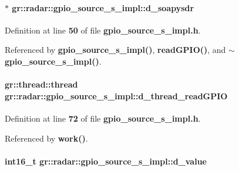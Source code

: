 \paragraph[{d\+\_\+soapysdr}]{$\ast$ gr\+::radar\+::gpio\+\_\+source\+\_\+s\+\_\+impl\+::d\+\_\+soapysdr\hspace{0.3cm}{\ttfamily [private]}}\label{classgr_1_1radar_1_1gpio__source__s__impl_a4428c8a14f93a91cb5294c10dfd43f9f}


Definition at line {\bf 50} of file {\bf gpio\+\_\+source\+\_\+s\+\_\+impl.\+h}.



Referenced by {\bf gpio\+\_\+source\+\_\+s\+\_\+impl()}, {\bf read\+G\+P\+I\+O()}, and {\bf $\sim$gpio\+\_\+source\+\_\+s\+\_\+impl()}.

\paragraph[{d\+\_\+thread\+\_\+read\+G\+P\+IO}]{\setlength{\rightskip}{0pt plus 5cm}gr\+::thread\+::thread gr\+::radar\+::gpio\+\_\+source\+\_\+s\+\_\+impl\+::d\+\_\+thread\+\_\+read\+G\+P\+IO\hspace{0.3cm}{\ttfamily [private]}}\label{classgr_1_1radar_1_1gpio__source__s__impl_aa185f8bf6a4d3d2d21021814976ba308}


Definition at line {\bf 72} of file {\bf gpio\+\_\+source\+\_\+s\+\_\+impl.\+h}.



Referenced by {\bf work()}.

\paragraph[{d\+\_\+value}]{\setlength{\rightskip}{0pt plus 5cm}int16\+\_\+t gr\+::radar\+::gpio\+\_\+source\+\_\+s\+\_\+impl\+::d\+\_\+value\hspace{0.3cm}{\ttfamily [private]}}\label{classgr_1_1radar_1_1gpio__source__s__impl_a52c4c1ab72b8e2f67295a9fc68bccfce}


